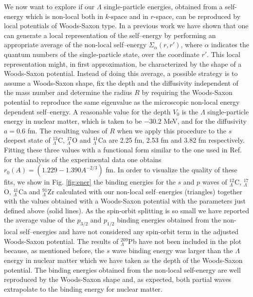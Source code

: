 We now want to explore if our $\Lambda$ single-particle
energies, obtained from a self-energy which is non-local both in
$k$-space and in $r$-space, can be reproduced by local potentials
of Woods-Saxon type. In a previous 
work \cite{hjort96} we have shown that one can generate a
local representation of the self--energy by performing an appropriate
average of the non-local self--energy $\Sigma_{\alpha}(r,r')$, where
$\alpha$ indicates the quantum numbers of the single-particle state, over
the
coordinate $r'$. This local
representation might, in first approximation, be characterized by the
shape of a Woods-Saxon potential. Instead of doing this average, a possible 
strategy is to assume a Woods-Saxon shape, fix the depth and the
diffusivity independent of the mass number and determine the radius
$R$ by requiring the Woods-Saxon potential to reproduce the same
eigenvalue as the microscopic non-local energy dependent
self--energy. A reasonable value for the depth $V_0$ is the $\Lambda$
single-particle energy in nuclear matter, which is taken to be $-30.2$
MeV, and for
the diffusivity $a=0.6$ fm. The resulting values of $R$ when we apply this
procedure to the $s$ deepest state of $^{13}_{\Lambda}$C,
$^{17}_{\Lambda}$O and $^{41}_{\Lambda}$Ca are 2.25 fm, 2.53 fm and
3.82 fm respectively. Fitting these three values with a functional form similar
to the one used in Ref. \cite{mille88} for the analysis of the experimental data
one obtains $r_0(A)=(1.229 - 1.390 A^{-2/3})$ fm. In order to visualize the quality
of these fits, we show in Fig. \ref{fig:ener} the binding energies for the
$s$ and $p$ waves of $^{12}_{\Lambda}$C, $^{17}_{\Lambda}$O, $^{41}_{\Lambda}$Ca and
$^{91}_{\Lambda}$Zr calculated with our non-local self--energies
(triangles) together 
with the values obtained with a Woods-Saxon potential with 
the parameters just defined above (solid lines). 
As the spin-orbit splitting is so small we 
have reported the average value of the $p_{3/2}$ and $p_{1/2}$ 
binding energies obtained from the non-local
self--energies and have
not considered any spin-orbit term in the  adjusted Woods-Saxon potential.   
The results of $^{209}_{\Lambda}$Pb have not been included in the plot because,
as mentioned before, the $s$ wave binding energy was larger than the
$\Lambda$ energy in nuclear matter which we have taken as the depth of
the Woods-Saxon potential. 
The binding energies obtained from the non-local self-energy are well
reproduced by the Woods-Saxon
shape and, as expected, both partial waves extrapolate to the binding
energy for nuclear matter.

